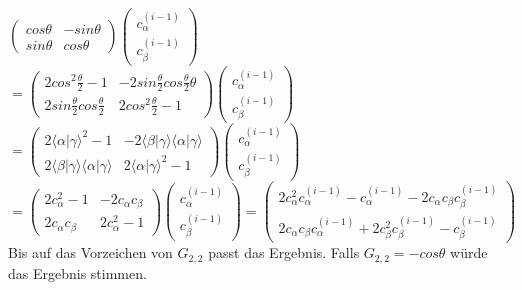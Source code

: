 \documentclass[a4paper]{scrartcl}
\begin{document}
\begin{enumerate}[a)]
$\begin{pmatrix} cos \theta & -sin \theta\\ sin \theta & cos \theta \end{pmatrix} \begin{pmatrix} c_{\alpha}^{(i-1)}\\ c_{\beta}^{(i-1)}\end{pmatrix}$\\
$= \begin{pmatrix} 2 cos^2 \frac{\theta}{2}-1 & -2 sin \frac{\theta}{2} cos \frac{\theta}{2} \theta\\ 2 sin \frac{\theta}{2} cos \frac{\theta}{2} & 2 cos^2 \frac{\theta}{2}-1 \end{pmatrix} \begin{pmatrix} c_{\alpha}^{(i-1)}\\ c_{\beta}^{(i-1)}\end{pmatrix}$\\
$= \begin{pmatrix} 2 \langle \alpha | \gamma \rangle^2 -1 & -2 \langle \beta | \gamma \rangle \langle \alpha | \gamma \rangle \\ 2 \langle \beta | \gamma \rangle \langle \alpha | \gamma \rangle & 2 \langle \alpha | \gamma \rangle^2 -1 \end{pmatrix} \begin{pmatrix} c_{\alpha}^{(i-1)}\\ c_{\beta}^{(i-1)}\end{pmatrix}$\\
$= \begin{pmatrix} 2 c_{\alpha}^2 -1 & -2 c_{\alpha}c_{\beta} \\ 2 c_{\alpha}c_{\beta} & 2 c_{\alpha}^2 -1 \end{pmatrix} \begin{pmatrix} c_{\alpha}^{(i-1)}\\ c_{\beta}^{(i-1)}\end{pmatrix}
= \begin{pmatrix} 2c_{\alpha}^2 c_{\alpha}^{(i-1)} -c_{\alpha}^{(i-1)} - 2c_{\alpha}c_{\beta} c_{\beta}^{(i-1)} \\ 2c_{\alpha}c_{\beta} c_{\alpha}^{(i-1)} + 2c_{\beta}^2 c_{\beta}^{(i-1)} -c_{\beta}^{(i-1)}\end{pmatrix}$\\

Bis auf das Vorzeichen von $G_{2,2}$ passt das Ergebnis. Falls $G_{2,2} = -cos \theta$ würde das Ergebnis stimmen.

\end{enumerate}
\end{document}
